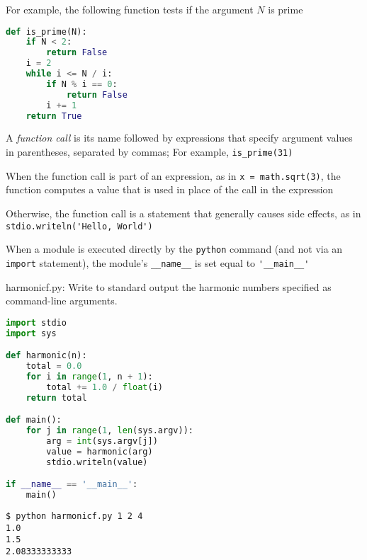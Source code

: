 \documentclass[8pt,a4paper,compress]{beamer}
\begin{document}
\begin{frame}[fragile]
For example, the following function tests if the argument $N$ is prime

\begin{lstlisting}[language=Python]
def is_prime(N):
    if N < 2: 
        return False
    i = 2
    while i <= N / i:
        if N % i == 0:
            return False
        i += 1
    return True
\end{lstlisting}

\bigskip

A \emph{function call} is its name followed by expressions that specify argument values in parentheses, separated by commas; For example, \lstinline{is_prime(31)}

\bigskip

When the function call is part of an expression, as in \lstinline{x = math.sqrt(3)}, the function computes a value that is used in place of the call in the expression

\bigskip

Otherwise, the function call is a statement that generally causes side effects, as in \lstinline{stdio.writeln('Hello, World')}

\bigskip

When a module is executed directly by the \lstinline{python} command (and not via an \lstinline{import} statement), the module's \lstinline{__name__} is set equal to \lstinline{'__main__'}
\end{frame}

\begin{frame}[fragile]
\begin{framed}
\tiny harmonicf.py:  Write to standard output the harmonic numbers specified as command-line arguments.
\end{framed}

\begin{lstlisting}[language=Python]
import stdio
import sys

def harmonic(n):
    total = 0.0
    for i in range(1, n + 1):
        total += 1.0 / float(i)
    return total

def main():
    for j in range(1, len(sys.argv)):
        arg = int(sys.argv[j])
        value = harmonic(arg)
        stdio.writeln(value)

if __name__ == '__main__':
    main()
\end{lstlisting}

\begin{lstlisting}[language={}]
$ python harmonicf.py 1 2 4
1.0
1.5
2.08333333333
\end{lstlisting}
\end{frame}
\end{document}
